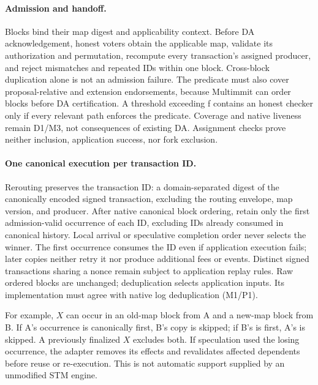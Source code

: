 \paragraph{Admission and handoff.}
Blocks bind their map digest and applicability context. Before DA acknowledgement, honest voters obtain the applicable map, validate its authorization and permutation, recompute every transaction's assigned producer, and reject mismatches and repeated IDs within one block. Cross-block duplication alone is not an admission failure. The predicate must also cover proposal-relative and extension endorsements, because Multimmit can order blocks before DA certification. A threshold exceeding f contains an honest checker only if every relevant path enforces the predicate. Coverage and native liveness remain D1/M3, not consequences of existing DA. \citep{autobahn,multimmit} Assignment checks prove neither inclusion, application success, nor fork exclusion.

\paragraph{One canonical execution per transaction ID.}
Rerouting preserves the transaction ID: a domain-separated digest of the canonically encoded signed transaction, excluding the routing envelope, map version, and producer. After native canonical block ordering, retain only the first admission-valid occurrence of each ID, excluding IDs already consumed in canonical history. Local arrival or speculative completion order never selects the winner. The first occurrence consumes the ID even if application execution fails; later copies neither retry it nor produce additional fees or events. Distinct signed transactions sharing a nonce remain subject to application replay rules. Raw ordered blocks are unchanged; deduplication selects application inputs. Its implementation must agree with native log deduplication (M1/P1).

For example, \(X\) can occur in an old-map block from A and a new-map block from B. If A's occurrence is canonically first, B's copy is skipped; if B's is first, A's is skipped. A previously finalized \(X\) excludes both. If speculation used the losing occurrence, the adapter removes its effects and revalidates affected dependents before reuse or re-execution. This is not automatic support supplied by an unmodified STM engine.


